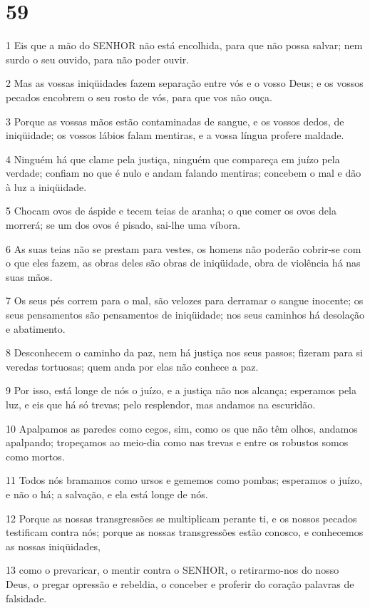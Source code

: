 \chapter{59}

\par 1 Eis que a mão do SENHOR não está encolhida, para que não possa salvar; nem surdo o seu ouvido, para não poder ouvir.
\par 2 Mas as vossas iniqüidades fazem separação entre vós e o vosso Deus; e os vossos pecados encobrem o seu rosto de vós, para que vos não ouça.
\par 3 Porque as vossas mãos estão contaminadas de sangue, e os vossos dedos, de iniqüidade; os vossos lábios falam mentiras, e a vossa língua profere maldade.
\par 4 Ninguém há que clame pela justiça, ninguém que compareça em juízo pela verdade; confiam no que é nulo e andam falando mentiras; concebem o mal e dão à luz a iniqüidade.
\par 5 Chocam ovos de áspide e tecem teias de aranha; o que comer os ovos dela morrerá; se um dos ovos é pisado, sai-lhe uma víbora.
\par 6 As suas teias não se prestam para vestes, os homens não poderão cobrir-se com o que eles fazem, as obras deles são obras de iniqüidade, obra de violência há nas suas mãos.
\par 7 Os seus pés correm para o mal, são velozes para derramar o sangue inocente; os seus pensamentos são pensamentos de iniqüidade; nos seus caminhos há desolação e abatimento.
\par 8 Desconhecem o caminho da paz, nem há justiça nos seus passos; fizeram para si veredas tortuosas; quem anda por elas não conhece a paz.
\par 9 Por isso, está longe de nós o juízo, e a justiça não nos alcança; esperamos pela luz, e eis que há só trevas; pelo resplendor, mas andamos na escuridão.
\par 10 Apalpamos as paredes como cegos, sim, como os que não têm olhos, andamos apalpando; tropeçamos ao meio-dia como nas trevas e entre os robustos somos como mortos.
\par 11 Todos nós bramamos como ursos e gememos como pombas; esperamos o juízo, e não o há; a salvação, e ela está longe de nós.
\par 12 Porque as nossas transgressões se multiplicam perante ti, e os nossos pecados testificam contra nós; porque as nossas transgressões estão conosco, e conhecemos as nossas iniqüidades,
\par 13 como o prevaricar, o mentir contra o SENHOR, o retirarmo-nos do nosso Deus, o pregar opressão e rebeldia, o conceber e proferir do coração palavras de falsidade.
